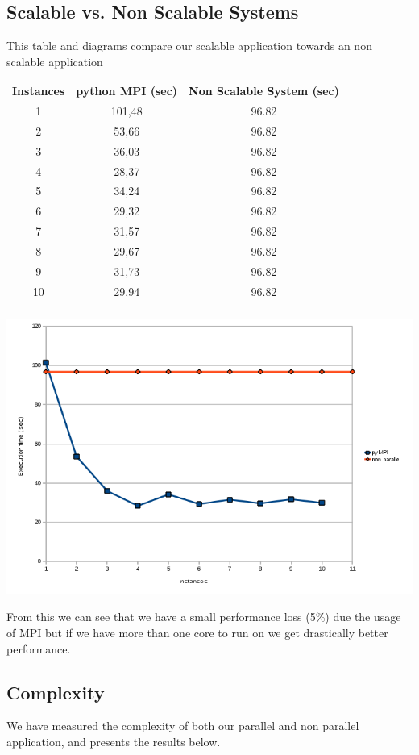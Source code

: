 \documentclass{article}
\begin{document}
{\subsection{Scalable vs. Non Scalable Systems}
This table and diagrams compare our scalable application towards an non
scalable application

\begin{tabular}{c c c}
  \rowcolor[gray]{0.5}
  {\bf Instances} & {\bf python MPI (sec)} & {\bf Non Scalable System (sec)} \\
  1 & 101,48 & 96.82 \\
  2 & 53,66  & 96.82  \\
  3 & 36,03  & 96.82  \\
  4 & 28,37  & 96.82  \\
  5 & 34,24  & 96.82  \\
  6 & 29,32  & 96.82  \\
  7 & 31,57  & 96.82  \\
  8 & 29,67  & 96.82  \\
  9 & 31,73  & 96.82  \\
 10 & 29,94  & 96.82  \\
\rowcolor[gray]{0.5}
\end{tabular}
\newline
\includegraphics[width=\textwidth]{img/parallel-vs-non-parallel.png}

From this we can see that we have a small performance loss (5\%) due the usage
of MPI but if we have more than one core to run on we get drastically better
performance.


\subsection{Complexity}
We have measured the complexity of both our parallel and non parallel
application, and presents the results below.

}
\end{document}

